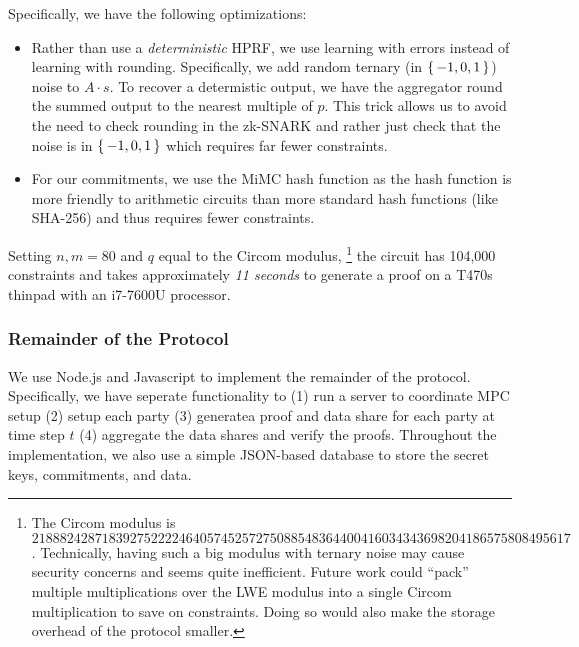 Specifically, we have the following optimizations:
\begin{itemize}
	\item Rather than use a \emph{deterministic} HPRF, we use learning with errors instead of learning with rounding.
		Specifically, we add random ternary (in $\set{-1, 0, 1}$) noise to $A \cdot s$.
		To recover a determistic output, we have the aggregator round the summed output to the nearest multiple of $p$.
		This trick allows us to avoid the need to check rounding in the zk-SNARK and rather just check that the noise is in $\set{-1, 0, 1}$ which requires far fewer constraints.
	\item For our commitments, we use the MiMC hash function as the hash function is more friendly to arithmetic circuits than more standard hash functions (like SHA-256) and thus requires fewer constraints.
\end{itemize}
Setting $n, m = 80$ and $q$ equal to the Circom modulus,
\footnote{
	The Circom modulus is $21888242871839275222246405745257275088548364400416034343698204186575808495617$.
	Technically, having such a big modulus with ternary noise may cause security concerns and seems quite inefficient.
	Future work could ``pack'' multiple multiplications over the LWE modulus into a single Circom multiplication to save on constraints.
	Doing so would also make the storage overhead of the protocol smaller.
}
the circuit has 104,000 constraints and takes approximately \emph{11 seconds} to generate a proof on a T470s thinpad with an i7-7600U processor.

\subsubsection*{Remainder of the Protocol}
We use Node.js and Javascript to implement the remainder of the protocol.
Specifically, we have seperate functionality to (1) run a server to coordinate MPC setup (2) setup each party (3) generatea proof and data share for each party at time step $t$ (4) aggregate the data shares and verify the proofs.
Throughout the implementation, we also use a simple JSON-based database to store the secret keys, commitments, and data.

